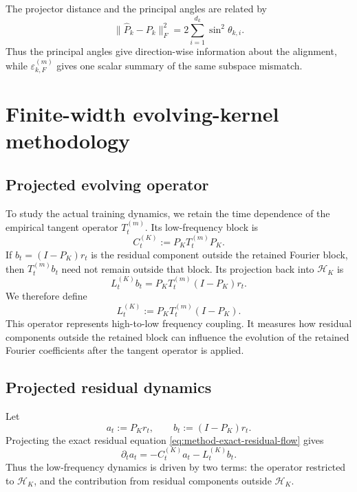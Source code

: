 The projector distance and the principal angles are related by
\begin{equation}
	\|\widehat P_k-P_k\|_F^2
	=
	2\sum_{i=1}^{d_k}\sin^2\theta_{k,i}.
	\label{eq:method-projector-angle-identity}
\end{equation}
Thus the principal angles give direction-wise information about the alignment,
while \(\varepsilon_{k,F}^{(m)}\) gives one scalar summary of the same subspace
mismatch.

\section{Finite-width evolving-kernel methodology}

\subsection{Projected evolving operator}

To study the actual training dynamics, we retain the time dependence of the empirical tangent
operator \(T_t^{(m)}\). Its low-frequency block is
\begin{equation}
	C_t^{(K)}:=P_KT_t^{(m)}P_K.
	\label{eq:method-evolving-block}
\end{equation}
If \(b_t=(I-P_K)r_t\) is the residual component outside the retained Fourier
block, then \(T_t^{(m)}b_t\) need not remain outside that block. Its projection
back into \(\mathcal H_K\) is
\begin{equation}
	L_t^{(K)}b_t
	=
	P_KT_t^{(m)}(I-P_K)r_t.
\end{equation}
We therefore define
\begin{equation}
	L_t^{(K)}:=P_KT_t^{(m)}(I-P_K).
	\label{eq:method-leakage-operator}
\end{equation}
This operator represents high-to-low frequency coupling. It measures how
residual components outside the retained block can influence the evolution of
the retained Fourier coefficients after the tangent operator is applied.

\subsection{Projected residual dynamics}

Let
\begin{equation}
	a_t:=P_Kr_t,
	\qquad
	b_t:=(I-P_K)r_t.
	\label{eq:method-low-high-residual-split}
\end{equation}
Projecting the exact residual equation \eqref{eq:method-exact-residual-flow} gives
\begin{equation}
	\partial_t a_t
	=
	-C_t^{(K)}a_t
	-
	L_t^{(K)}b_t.
	\label{eq:method-projected-residual-flow}
\end{equation}
Thus the low-frequency dynamics is driven by two terms: the operator restricted
to \(\mathcal H_K\), and the contribution from residual components outside
\(\mathcal H_K\).

